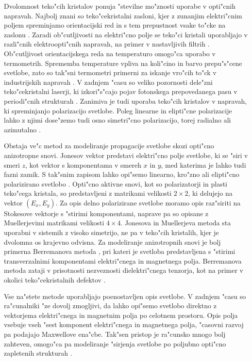 \documentclass[12pt,twoside,openright,final]{report}
\begin{document}
Dvolomnost teko"cih kristalov ponuja "stevilne mo"znosti uporabe v opti"cnih napravah. 
Najbolj znani so teko"cekristalni zasloni, kjer z zunanjim elektri"cnim poljem spreminjamo orientacijski red in s tem prepustnost vsake to"cke na zaslonu \cite{optics-lcd}. 
Zaradi ob"cutljivosti na elektri"cno polje se teko"ci kristali uporabljajo v razli"cnih elektroopti"cnih napravah, na primer v nastavljivih filtrih \cite{filters-sneh}.
Ob"cutljivost orientacijskega reda na temperaturo omogo"ca uporabo v termometrih. 
Sprememba temperature vpliva na koli"cino in barvo prepu"s"cene svetlobe, zato so tak"sni termometri primerni za iskanje vro"cih to"ck v industrijskih napravah \cite{hot-spots}. 
V zadnjem "casu so veliko pozornosti dele"zni teko"cekristalni laserji, ki izkori"s"cajo pojav fotonskega prepovedanega pasu v periodi"cnih strukturah \cite{humar-musevic,coles-morris}. 
Zanimiva je tudi uporaba teko"cih kristalov v napravah, ki spreminjanjo polarizacijo svetlobe. 
Poleg linearne in elipti"cne polarizacije lahko z njimi dose"zemo tudi osno simetri"cno polarizacijo, torej radialno ali azimutalno \cite{polarization-converters-linear,polarization-converters-axial}. 

Obstaja ve"c metod za modeliranje propagacije svetlobe skozi opti"cno anizotropne snovi. 
Jonesov vektor predstavi elektri"cno polje svetlobe, ki se "siri v smeri $z$, kot vektor s komponentama v smereh $x$ in $y$, med katerima je lahko tudi fazni zamik. 
S tak"snim zapisom lahko opi"semo linearno, kro"zno ali elipti"cno polarizirano svetlobo \cite{optics-lcd}. 
Opti"cno aktivne snovi, kot so polarizatorji in plasti teko"cega kristala, so predstavljeni z matrikami velikosti $2\times 2$, ki delujejo na vektor $(E_x, E_y)$. 
Za opis delno polarizirane svetlobe moramo opis raz"siriti na Stokesove vektorje s "stirimi komponentami, naprave pa so opisane z Muellerjevimi matrikami velikosti $4\times 4$.
Jonesova in Muellerjeva metoda sta uporabni v sistemih z visoko simetrijo, ne pa v teko"cih kristalih, kjer je dvolomna os krajevno odvisna. 
Za modeliranje anizotropnih snovi je bolj primerna Berremanova metoda \cite{berreman,stallinga-berreman}, pri kateri je svetloba predstavljena s "stirimi transverzalnimi komponentami elektri"cnega in magnetnega polja. Berremanova metoda zataji v prisotnosti nezveznosti dielektri"cnega tenzorja, kot na primer v okolici teko"cekristalnih defektov \cite{metode-kriezis, hwang-rey}. 

Vse na"stete metode uporabljajo poenostavljen opis svetlobe. 
V zadnjem "casu so ra"cunalniki "ze dovolj zmogljivi, da lahko opi"semo svetlobo direktno z vektorjema elektri"cnega in magnetnim polja po celotnem prostoru. 
Opis polja vsebuje vseh "sest komponent elektri"cnega in magnetnega polja, "casovni razvoj pa podajajo Maxwellove ena"cbe. 
Tak"sen pristop je ra"cunsko mnogo bolj zahteven, omogo"ca pa modeliranje "sirjenja svetlobe po poljubno opti"cno zapletenih strukturah \cite{taflove}. 
\end{document}
